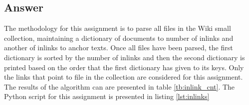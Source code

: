 \documentclass{article}
\begin{document}
		\subsection*{Answer}
		The methodology for this assignment is to parse all files in the Wiki small collection, maintaining a dictionary of documents to number of inlinks and another of inlinks to anchor texts. Once all files have been parsed, the first dictionary is sorted by the number of inlinks and then the second dictionary is printed based on the order that the first dictionary has given to its keys. Only the links that point to file in the collection are considered for this assignment. The results of the algorithm can are presented in table \ref{tb:inlink_cnt}. The Python script for this assignment is presented in listing \ref{lst:inlinks}
		\begin{table}[]
			\centering
			\caption{Top ten documents with the most inlinks with their anchors}
			\label{tb:inlink_cnt}
\end{table}
\end{document}

